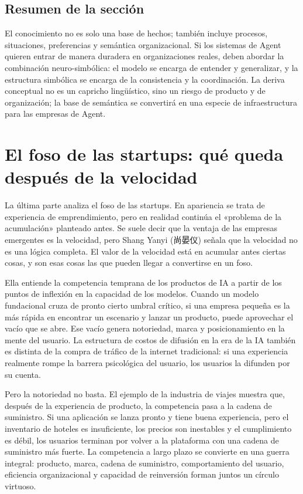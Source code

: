 \documentclass[a4paper]{article}
\begin{document}
\subsection{Resumen de la sección}

El conocimiento no es solo una base de hechos; también incluye procesos, situaciones, preferencias y semántica organizacional. Si los sistemas de Agent quieren entrar de manera duradera en organizaciones reales, deben abordar la combinación neuro-simbólica: el modelo se encarga de entender y generalizar, y la estructura simbólica se encarga de la consistencia y la coordinación. La deriva conceptual no es un capricho lingüístico, sino un riesgo de producto y de organización; la base de semántica se convertirá en una especie de infraestructura para las empresas de Agent.
\section{El foso de las startups: qué queda después de la velocidad}

La última parte analiza el foso de las startups. En apariencia se trata de experiencia de emprendimiento, pero en realidad continúa el «problema de la acumulación» planteado antes. Se suele decir que la ventaja de las empresas emergentes es la velocidad, pero Shang Yanyi (尚晏仪) señala que la velocidad no es una lógica completa. El valor de la velocidad está en acumular antes ciertas cosas, y son esas cosas las que pueden llegar a convertirse en un foso.

Ella entiende la competencia temprana de los productos de IA a partir de los puntos de inflexión en la capacidad de los modelos. Cuando un modelo fundacional cruza de pronto cierto umbral crítico, si una empresa pequeña es la más rápida en encontrar un escenario y lanzar un producto, puede aprovechar el vacío que se abre. Ese vacío genera notoriedad, marca y posicionamiento en la mente del usuario. La estructura de costos de difusión en la era de la IA también es distinta de la compra de tráfico de la internet tradicional: si una experiencia realmente rompe la barrera psicológica del usuario, los usuarios la difunden por su cuenta.

Pero la notoriedad no basta. El ejemplo de la industria de viajes muestra que, después de la experiencia de producto, la competencia pasa a la cadena de suministro. Si una aplicación se lanza pronto y tiene buena experiencia, pero el inventario de hoteles es insuficiente, los precios son inestables y el cumplimiento es débil, los usuarios terminan por volver a la plataforma con una cadena de suministro más fuerte. La competencia a largo plazo se convierte en una guerra integral: producto, marca, cadena de suministro, comportamiento del usuario, eficiencia organizacional y capacidad de reinversión forman juntos un círculo virtuoso.
\end{document}
